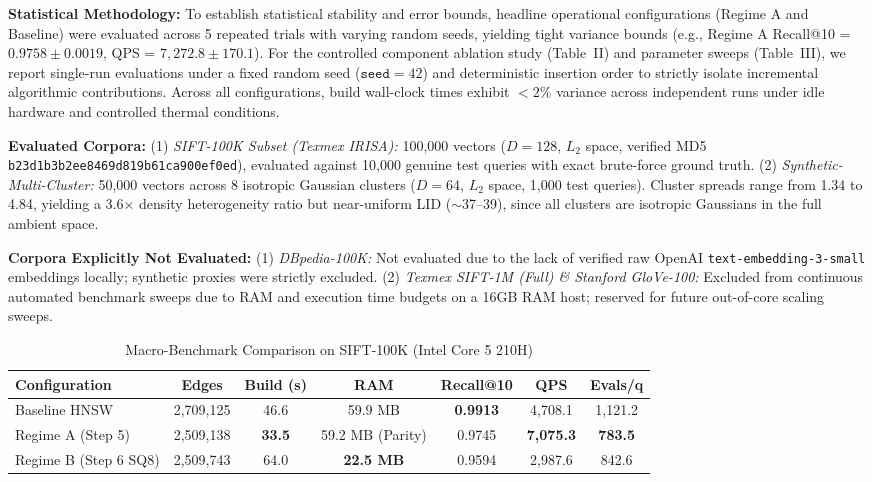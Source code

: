 \documentclass[conference,10pt]{IEEEtran}
\begin{document}
\textbf{Statistical Methodology:} To establish statistical stability and error bounds, headline operational configurations (Regime A and Baseline) were evaluated across 5 repeated trials with varying random seeds, yielding tight variance bounds (e.g., Regime A Recall@10 = $0.9758 \pm 0.0019$, QPS = $7,272.8 \pm 170.1$). For the controlled component ablation study (Table~II) and parameter sweeps (Table~III), we report single-run evaluations under a fixed random seed ($\texttt{seed}=42$) and deterministic insertion order to strictly isolate incremental algorithmic contributions. Across all configurations, build wall-clock times exhibit $<2\%$ variance across independent runs under idle hardware and controlled thermal conditions.

\textbf{Evaluated Corpora:}
(1) \textit{SIFT-100K Subset (Texmex IRISA):} 100,000 vectors ($D=128$, $L_2$ space, verified MD5 \texttt{b23d1b3b2ee8469d819b61ca900ef0ed}), evaluated against 10,000 genuine test queries with exact brute-force ground truth.
(2) \textit{Synthetic-Multi-Cluster:} 50,000 vectors across 8 isotropic Gaussian clusters ($D=64$, $L_2$ space, 1,000 test queries). Cluster spreads range from 1.34 to 4.84, yielding a 3.6$\times$ density heterogeneity ratio but near-uniform LID ($\sim$37--39), since all clusters are isotropic Gaussians in the full ambient space.

\textbf{Corpora Explicitly Not Evaluated:}
(1) \textit{DBpedia-100K:} Not evaluated due to the lack of verified raw OpenAI \texttt{text-embedding-3-small} embeddings locally; synthetic proxies were strictly excluded.
(2) \textit{Texmex SIFT-1M (Full) \& Stanford GloVe-100:} Excluded from continuous automated benchmark sweeps due to RAM and execution time budgets on a 16GB RAM host; reserved for future out-of-core scaling sweeps.

\begin{table}[htbp]
\caption{Macro-Benchmark Comparison on SIFT-100K (Intel Core 5 210H)}
\centering
\begin{tabular}{lcccccc}
\toprule
\textbf{Configuration} & \textbf{Edges} & \textbf{Build (s)} & \textbf{RAM} & \textbf{Recall@10} & \textbf{QPS} & \textbf{Evals/q} \\
\midrule
Baseline HNSW & 2,709,125 & 46.6 & 59.9 MB & \textbf{0.9913} & 4,708.1 & 1,121.2 \\
Regime A (Step 5) & 2,509,138 & \textbf{33.5} & 59.2 MB (Parity) & 0.9745 & \textbf{7,075.3} & \textbf{783.5} \\
Regime B (Step 6 SQ8) & 2,509,743 & 64.0 & \textbf{22.5 MB} & 0.9594 & 2,987.6 & 842.6 \\
\bottomrule
\end{tabular}
\end{table}
\end{document}
